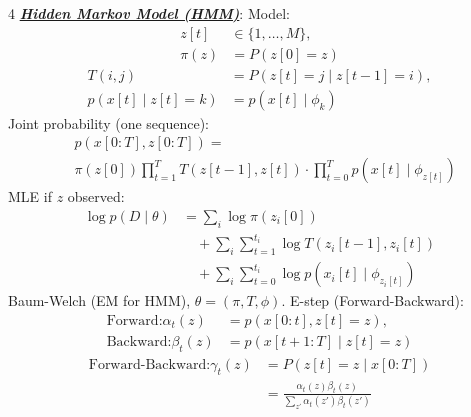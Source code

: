 \documentclass[12pt]{article}
\newcommand{\bulletPoint}[1]{\ul{\textit{\textbf{#1}}}}
\begin{document}
\begin{multicols*}{4}
\bulletPoint{Hidden Markov Model (HMM)}:
Model:
\useshortskip \begin{equation*}
    \begin{split}
        z[t]&\in\{1,\ldots,M\},\\
        \pi(z)&=P(z[0]=z)
    \end{split}
\end{equation*}
\useshortskip \begin{equation*}
    \begin{split}
        T(i,j)&=P(z[t]=j\mid z[t-1]=i),\\
        p(x[t]\mid z[t]=k)&=p(x[t]\mid \phi_k)
    \end{split}
\end{equation*}
Joint probability (one sequence):
\useshortskip \begin{equation*}
    \begin{split}
        &p(x[0:T],z[0:T])=\\
        &\pi(z[0])\prod_{t=1}^{T}T(z[t-1],z[t])\cdot\prod_{t=0}^{T}p(x[t]\mid \phi_{z[t]})
    \end{split}
\end{equation*}
MLE if $z$ observed:
\useshortskip \begin{equation*}
    \begin{split}
        \log p(D\mid\theta)
        &=\sum_i \log \pi(z_i[0]) \\
        &\quad+\sum_i\sum_{t=1}^{t_i}\log T(z_i[t-1],z_i[t]) \\
        &\quad+\sum_i\sum_{t=0}^{t_i}\log p(x_i[t]\mid \phi_{z_i[t]})
    \end{split}
\end{equation*}
Baum-Welch (EM for HMM), $\theta=(\pi,T,\phi)$.
E-step (Forward-Backward):
\useshortskip \begin{equation*}
    \begin{split}
        \text{Forward:}\alpha_t(z)&=p(x[0:t],z[t]=z),\\
        \text{Backward:}\beta_t(z)&=p(x[t+1:T]\mid z[t]=z)
    \end{split}
\end{equation*}
\useshortskip \begin{equation*}
    \begin{split}
        \text{Forward-Backward:}\gamma_t(z)&=P(z[t]=z\mid x[0:T])\\
        &=\frac{\alpha_t(z)\beta_t(z)}
        {\sum_{z'}\alpha_t(z')\beta_t(z')}
    \end{split}
\end{equation*}

\end{multicols*}
\end{document}
